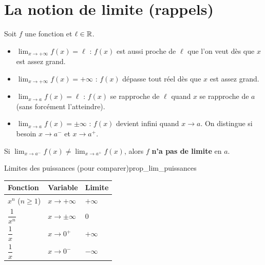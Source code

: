 \section{La notion de limite (rappels)}

\begin{definition}
	Soit $f$ une fonction et $\ell \in \mathbb{R}$.
	\begin{itemize}[label=\textbullet]
		\item $\displaystyle\lim_{x\to+\infty}f(x)=\ell$ : $f(x)$ est aussi proche
		de $\ell$ que l'on veut dès que $x$ est assez grand.
		\item $\displaystyle\lim_{x\to+\infty}f(x)=+\infty$ : $f(x)$ dépasse tout
		réel dès que $x$ est assez grand.
		\item $\displaystyle\lim_{x\to a}f(x)=\ell$ : $f(x)$ se rapproche de $\ell$
		quand $x$ se rapproche de $a$ (sans forcément l'atteindre).
		\item $\displaystyle\lim_{x\to a}f(x)=\pm\infty$ : $f(x)$ devient infini
		quand $x\to a$. On distingue si besoin $x\to a^-$ et $x\to a^+$.
	\end{itemize}
\end{definition}

\begin{remarque}
	Si $\displaystyle\lim_{x\to a^-}f(x)\neq\lim_{x\to a^+}f(x)$, alors $f$
	\textbf{n'a pas de limite} en $a$.
\end{remarque}

\begin{propriete}{Limites des puissances (pour comparer)}{prop_lim_puissances}
	\begin{center}
	\renewcommand{\arraystretch}{1.5}
	\begin{tabular}{>{\centering\arraybackslash}p{2.4cm}
	                >{\centering\arraybackslash}p{2.2cm}
	                >{\centering\arraybackslash}p{2.2cm}}
	\hline
	\textbf{Fonction} & \textbf{Variable} & \textbf{Limite} \\
	\hline
	$x^n$ ($n\geq 1$)      & $x\to+\infty$   & $+\infty$ \\
	$\dfrac{1}{x^n}$       & $x\to\pm\infty$ & $0$ \\
	$\dfrac{1}{x}$         & $x\to 0^+$      & $+\infty$ \\
	$\dfrac{1}{x}$         & $x\to 0^-$      & $-\infty$ \\
	\hline
	\end{tabular}
	\end{center}
\end{propriete}


